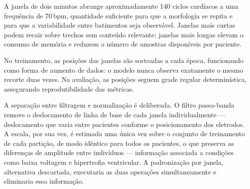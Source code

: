 \begin{table}[h!]
	\captionsetup{width=14cm}
\end{table}

A janela de dois minutos abrange aproximadamente 140 ciclos cardíacos a uma
frequência de 70\,bpm, quantidade suficiente para que a morfologia se repita
e para que a variabilidade entre batimentos seja observável. Janelas mais
curtas podem recair sobre trechos sem conteúdo relevante; janelas mais longas
elevam o consumo de memória e reduzem o número de amostras disponíveis por
paciente.

No treinamento, as posições das janelas são sorteadas a cada época,
funcionando como forma de aumento de dados: o modelo nunca observa
exatamente o mesmo recorte duas vezes. Na avaliação, as posições seguem grade
regular determinística, assegurando reprodutibilidade das métricas.

A separação entre filtragem e normalização é deliberada. O filtro
passa-banda remove o deslocamento de linha de base de cada janela
individualmente --- deslocamento que varia entre pacientes conforme o
posicionamento dos eletrodos. A escala,
por sua vez, é estimada uma única vez sobre o conjunto de treinamento de cada
partição, de modo idêntico para todos os pacientes, o que preserva as
diferenças de amplitude entre indivíduos --- informação associada a condições
como baixa voltagem e hipertrofia ventricular. A padronização por janela,
alternativa descartada, executaria as duas operações simultaneamente e
eliminaria essa informação.

